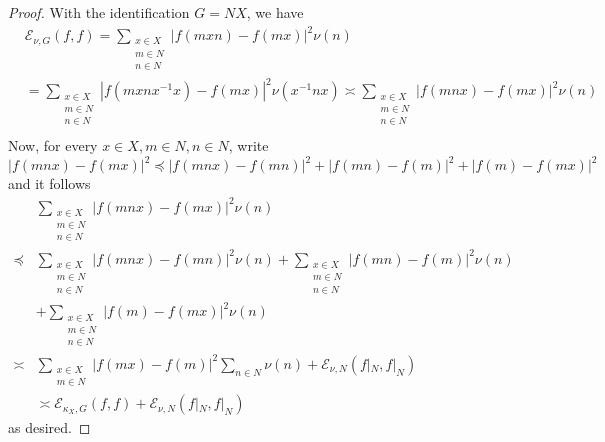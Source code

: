 \documentclass[10pt,a4paper]{amsart}
\begin{document}
\begin{proof}
With the identification $G = NX$, we have
\begin{align*}
     & \mathcal{E}_{\nu, G} (f,f) 
     = \sum_{\substack{x\in X\\ m\in N\\n\in N}} |f(mxn) - f(mx)|^2 \nu(n)\\
      & = \sum_{\substack{x\in X\\ m\in N\\n\in N}} |f(mxnx^{-1}x) - f(mx)|^2 \nu(x^{-1}nx)  \asymp \sum_{\substack{x\in X\\ m\in N\\n\in N}} |f(mnx) - f(mx)|^2 \nu(n) \\
\end{align*}
Now, for every $x \in X, m \in N, n\in N$, write 
$$|f(mnx) - f(mx)|^2 \preccurlyeq |f(mnx) -f(mn)|^2 + |f(mn) - f(m)|^2 + |f(m) - f(mx)|^2$$
and it follows 
\begin{align*}
    &  \sum_{\substack{x\in X\\ m\in N\\n\in N}} |f(mnx) - f(mx)|^2 \nu(n)  \\
    \preccurlyeq &   \sum_{\substack{x\in X\\ m\in N\\n\in N}} |f(mnx) - f(mn)|^2 \nu(n) +  \sum_{\substack{x\in X\\ m\in N\\n\in N}} |f(mn) - f(m)|^2 \nu(n) \\
     & + 
    \sum_{\substack{x\in X\\ m\in N\\n\in N}} |f(m) - f(mx)|^2 \nu(n)  \\
   \asymp  &   \sum_{\substack{x\in X\\ m\in N}} |f(mx) - f(m)|^2 \sum_{n \in N} \nu(n) + \mathcal{E}_{\nu, N}(f|_N, f|_N) 
   \\
    & \asymp \mathcal{E}_{\kappa_X, G}(f,f) + \mathcal{E}_{\nu, N}(f|_N, f|_N)  
\end{align*}
as desired. 
\end{proof}
\end{document}
